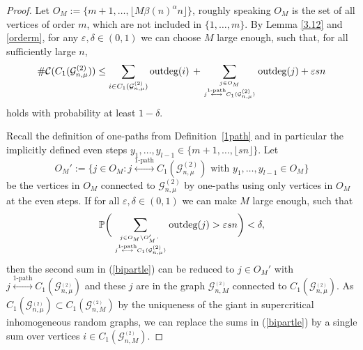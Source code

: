 \documentclass[12pt,a4paper]{article}
\numberwithin{equation}{section}
\begin{document}
\begin{proof}
Let $O_M:=\{m+1,\dots, \lfloor M \beta(n)^{\alpha}n\rfloor \}$, roughly speaking $O_M$ is the set of all vertices of order $m$, which are not included in $\{1,\dots,m\}$. 
By Lemma \ref{3.12} and \ref{orderm}, for any $\varepsilon,\delta\in(0,1)$ we can choose $M$ large enough, such that, for all sufficiently large $n$,
\begin{align}\label{bipartle}
    \#\mathcal C(C_1(\mathcal G^{(2)}_{n,\mu})) \le  \sum_{i\in C_1(\mathcal G^{(2)}_{n,\mu})} \text{outdeg}(i) \,+\sum_{j\in O_M \atop j\overset{1\text{-path}}{\longleftrightarrow}C_1(\mathcal G^{(2)}_{n,\mu})}\text{outdeg}(j)+\varepsilon sn
\end{align}
holds with probability at least $1-\delta$.
\smallskip

Recall the definition of one-paths from Definition~\ref{1path} and
in particular the implicitly defined even steps $y_1,\ldots, y_{l-1}
\in\{m+1,\ldots, \lfloor sn \rfloor\}$. Let
$$O_M':=\{ j\in O_M \colon j\overset{1\text{-path}}{\longleftrightarrow}C_1(\mathcal G^{(2)}_{n,\mu}) \text{ with }
y_1,\ldots, y_{l-1} \in O_M\}$$
be the vertices in $O_M$ connected to $\mathcal G^{(2)}_{n,\mu}$
by one-paths using only vertices in $O_M$ at the even steps.
If for all $\varepsilon,\delta \in (0,1)$ we can make $M$ large enough, such that
\begin{align}\label{3.17}
    \mathbb P\bigg(\sum_{{j\in O_M\setminus O_M' \colon}\atop{ j\overset{1\text{-path}}{\longleftrightarrow}C_1(\mathcal G^{(2)}_{n,\mu})}} \text{outdeg}(j) > \varepsilon sn\bigg) < \delta,
\end{align}
then the second sum in (\ref{bipartle}) can be reduced to $j\in O_M'$ with 
$j\overset{1\text{-path}}{\longleftrightarrow}C_1(\mathcal G^{_{(2)}}_{n,\mu})$
and these $j$ are  in the graph
$\mathcal G^{_{(2)}}_{n,M}$ connected to 
$C_1(\mathcal G^{_{(2)}}_{n,\mu})$. As $C_1(\mathcal G^{_{(2)}}_{n,\mu})\subset C_1(\mathcal G^{_{(2)}}_{n,M})$ by the uniqueness of the giant in supercritical inhomogeneous random graphs,
we can replace the sums in (\ref{bipartle}) by a single sum over vertices $i\in C_1(\mathcal G^{_{(2)}}_{n,M})$. \pagebreak[3]
\smallskip


\end{proof}
\end{document}
